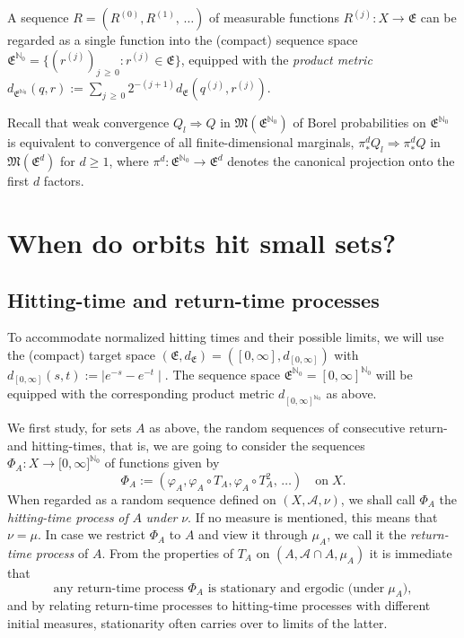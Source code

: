 \documentclass[AHL,Unicode,longabstracts]{cedram}
\newcommand{\clA}{\mathcal{A}}
\newcommand{\frkE}{\mathfrak{E}}
\newcommand{\frkM}{\mathfrak{M}}
\newcommand{\bbN}{\mathbb{N}}
\begin{document}
A sequence $R=(R^{(0)},R^{(1)},\,\ldots)$ of measurable functions $R^{(j)} :X\rightarrow\frkE$ can be regarded as a single function into the (compact) sequence space $\frkE^{\bbN_{0}}=\{(r^{(j)})_{j\,\geq\,0}:r^{(j)}\in\frkE\}$, equipped with the \emph{product metric} $d_{\frkE^{\bbN_{0}}}(q,r):=\sum_{j\,\geq\,0}2^{-(j+1)} d_{\frkE}(q^{(j)},r^{(j)})$.

Recall that weak convergence $Q_{l}\Longrightarrow Q$ in $\frkM (\frkE^{\bbN_{0}})$ of Borel probabilities on $\frkE ^{\bbN_{0}}$ is equivalent to convergence of all finite-dimensional marginals, $\pi_{\ast}^{d}Q_{l}\Longrightarrow\pi_{\ast}^{d}Q$ in $\frkM(\frkE^{d})$ for $d\geq1$, where $\pi^{d}:\frkE ^{\bbN_{0}}\rightarrow\frkE^{d}$ denotes the canonical projection onto the first $d$ factors.




\section{When do orbits hit small sets?}\label{Sec_When}


\subsection{Hitting-time and return-time processes}
To accommodate normalized hitting times and their possible limits, we will use the (compact) target space $(\frkE,d_{\frkE})=([0,\infty],d_{[0,\infty]})$ with $d_{[0,\infty]}(s,t):=\mid e^{-s}-e^{-t}\mid$. The sequence space $\frkE^{\bbN_{0}}=[0,\infty]^{\bbN_{0}}$ will be equipped with the corresponding product metric $d_{[0,\infty]^{\bbN_{0}}}$ as above.

We first study, for sets $A$ as above, the random sequences of consecutive return- and hitting-times, that is, we are going to consider the sequences $\Phi_{A}:X\rightarrow\lbrack0,\infty]^{\bbN_{0}}$ of functions given by
\begin{equation}\label{Eq_DefHitProc}
\Phi_{A}:=\left(\varphi_{A},\varphi_{A}\circ T_{A},\varphi_{A}\circ T_{A} ^{2},\,\ldots\right)\quad\text{on}\; X.
\end{equation}
When regarded as a random sequence defined on $(X,\clA,\nu)$, we shall call $\Phi_{A}$ the \emph{hitting-time process} \emph{of} $A$ \emph{under} $\nu$. If no measure is mentioned, this means that $\nu=\mu$. In case we restrict $\Phi_{A}$ to $A$ and view it through $\mu_{A}$, we call it the
\emph{return-time process} of $A$. From the properties of $T_{A}$ on $(A,\clA\cap A,\mu_{A})$ it is immediate that
\begin{equation} \label{Eq_bvxcnb}
\text{any return-time process }\Phi_{A}\text{ is stationary and ergodic (under}\; \mu_{A}),
\end{equation}
and by relating return-time processes to hitting-time processes with different initial measures, stationarity often carries over to limits of the latter. 
\end{document}
